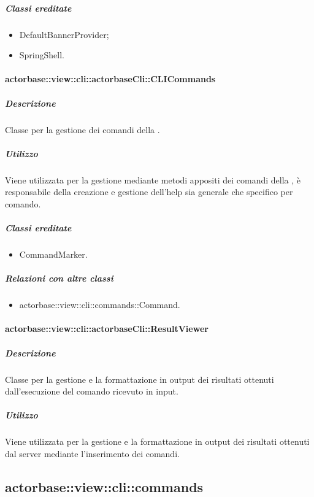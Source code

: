 \documentclass{scalatekids-article}
\begin{document}
\subparagraph{Classi ereditate}

\begin{itemize}
\item DefaultBannerProvider;
\item SpringShell.
\end{itemize}

\paragraph{actorbase::view::cli::actorbaseCli::CLICommands}

\subparagraph{Descrizione}

Classe per la gestione dei comandi della .

\subparagraph{Utilizzo}

Viene utilizzata per la gestione mediante metodi appositi dei comandi della , è responsabile della creazione e gestione dell'help sia generale che specifico per comando.

\subparagraph{Classi ereditate}

\begin{itemize}
\item CommandMarker.
\end{itemize}

\subparagraph{Relazioni con altre classi}

\begin{itemize}
\item actorbase::view::cli::commands::Command.
\end{itemize}

\paragraph{actorbase::view::cli::actorbaseCli::ResultViewer}

\subparagraph{Descrizione}

Classe per la gestione e la formattazione in output dei risultati ottenuti dall'esecuzione del comando ricevuto in input.

\subparagraph{Utilizzo}

Viene utilizzata per la gestione e la formattazione in output dei risultati ottenuti dal server mediante l'inserimento dei comandi.

\subsection{actorbase::view::cli::commands}
\end{document}
